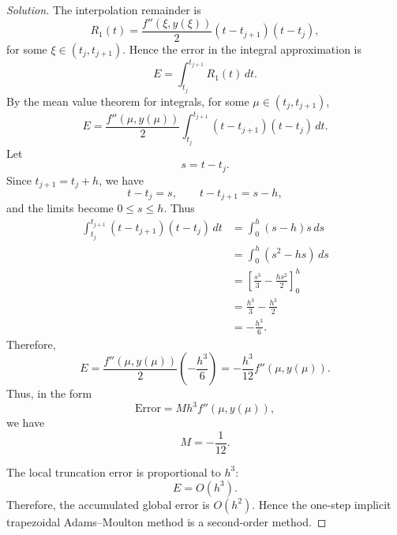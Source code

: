 \documentclass[12pt]{amsart}
\newenvironment{solution}
{\begin{proof}[Solution]}
{\end{proof}}
\begin{document}
\begin{onehalfspace}
\begin{solution}
            \item[(c)] The interpolation remainder is
            \[
                R_1(t)
                =
                \frac{f''(\xi,y(\xi))}{2}
                (t-t_{j+1})(t-t_j),
            \]
            for some \(\xi \in (t_j,t_{j+1})\). Hence the error in the integral
            approximation is
            \[
                E
                =
                \int_{t_j}^{t_{j+1}} R_1(t)\,dt.
            \]
            By the mean value theorem for integrals, for some
            \(\mu \in (t_j,t_{j+1})\),
            \[
                E
                =
                \frac{f''(\mu,y(\mu))}{2}
                \int_{t_j}^{t_{j+1}}
                (t-t_{j+1})(t-t_j)\,dt.
            \]
            Let
            \[
                s=t-t_j.
            \]
            Since \(t_{j+1}=t_j+h\), we have
            \[
                t-t_j=s,
                \qquad
                t-t_{j+1}=s-h,
            \]
            and the limits become \(0\leq s\leq h\). Thus
            \[
                \begin{aligned}
                    \int_{t_j}^{t_{j+1}}
                    (t-t_{j+1})(t-t_j)\,dt
                    &=
                    \int_0^h (s-h)s\,ds \\
                    &=
                    \int_0^h (s^2-hs)\,ds \\
                    &=
                    \left[
                        \frac{s^3}{3}
                        -
                        \frac{hs^2}{2}
                    \right]_0^h \\
                    &=
                    \frac{h^3}{3}
                    -
                    \frac{h^3}{2} \\
                    &=
                    -\frac{h^3}{6}.
                \end{aligned}
            \]
            Therefore,
            \[
                E
                =
                \frac{f''(\mu,y(\mu))}{2}
                \left(-\frac{h^3}{6}\right)
                =
                -\frac{h^3}{12}f''(\mu,y(\mu)).
            \]
            Thus, in the form
            \[
                \text{Error}
                =
                Mh^3 f''(\mu,y(\mu)),
            \]
            we have
            \[
                M=-\frac{1}{12}.
            \]

            \item[(d)] The local truncation error is proportional to \(h^3\):
            \[
                E=O(h^3).
            \]
            Therefore, the accumulated global error is \(O(h^2)\). Hence the
            one-step implicit trapezoidal Adams--Moulton method is a second-order method.
        \end{solution}


\end{onehalfspace}
\end{document}
